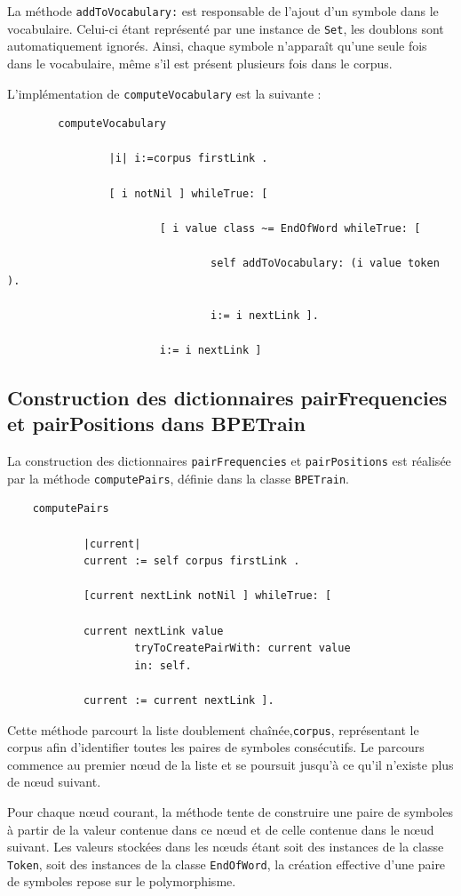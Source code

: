 \documentclass[12pt,a4paper]{report}
\begin{document}
	La méthode \texttt{addToVocabulary:} est responsable de l'ajout d'un symbole dans le vocabulaire. Celui-ci étant représenté par une instance de \texttt{Set}, les doublons sont automatiquement ignorés. Ainsi, chaque symbole n'apparaît qu'une seule fois dans le vocabulaire, même s'il est présent plusieurs fois dans le corpus.
	
	L'implémentation de \texttt{computeVocabulary} est la suivante :
	
	\begin{verbatim}
		computeVocabulary 

				|i|	i:=corpus firstLink .
					
				[ i notNil ] whileTrue: [
				 	
						[ i value class ~= EndOfWord whileTrue: [
						
								self addToVocabulary: (i value token ).
								
								i:= i nextLink ].
									
						i:= i nextLink ]
	\end{verbatim}
	
	\subsection{Construction des dictionnaires pairFrequencies et pairPositions dans BPETrain}
	
	La construction des dictionnaires \texttt{pairFrequencies} et \texttt{pairPositions} est réalisée par la méthode \texttt{computePairs}, définie dans la classe \texttt{BPETrain}.
	
	\begin{verbatim}
	computePairs
	
			|current|	
			current := self corpus firstLink .
				
			[current nextLink notNil ] whileTrue: [		
			
			current nextLink value
					tryToCreatePairWith: current value
					in: self.		
			
			current := current nextLink ].
	\end{verbatim}
	
	Cette méthode parcourt la liste doublement chaînée,\texttt{corpus}, représentant le corpus afin d'identifier toutes les paires de symboles consécutifs. Le parcours commence au premier nœud de la liste et se poursuit jusqu'à ce qu'il n'existe plus de nœud suivant.
	
	Pour chaque nœud courant, la méthode tente de construire une paire de symboles à partir de la valeur contenue dans ce nœud et de celle contenue dans le nœud suivant. Les valeurs stockées dans les nœuds étant soit des instances de la classe \texttt{Token}, soit des instances de la classe \texttt{EndOfWord}, la création effective d'une paire de symboles repose sur le polymorphisme.
	
\end{document}
